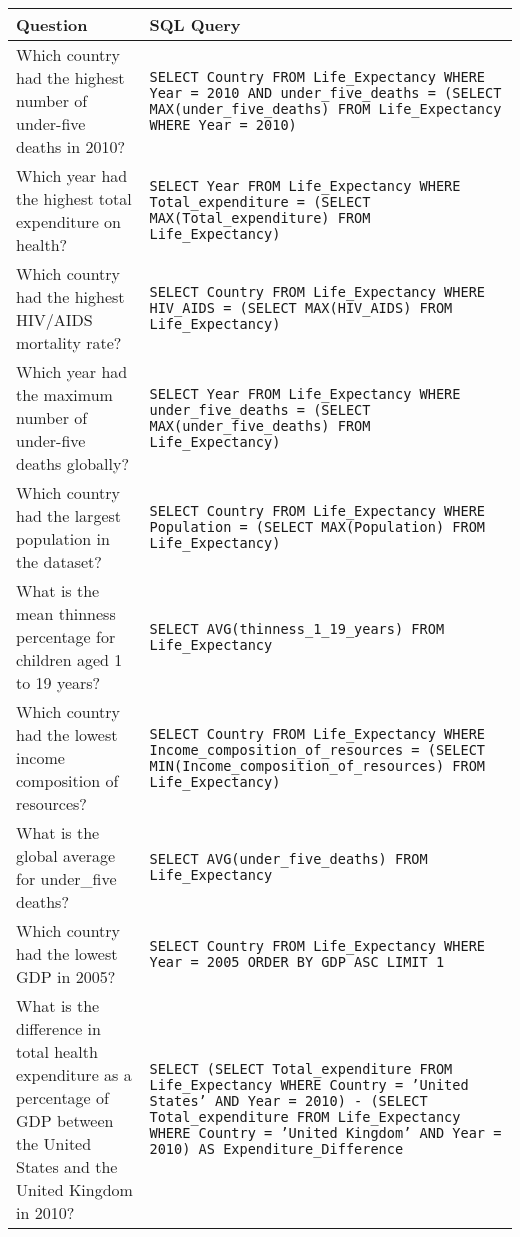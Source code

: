 \documentclass[11pt]{article}
\begin{document}
\begin{table*}[t]
\centering
\begin{tabular}{|p{}|p{}|}
\hline
\textbf{Question} & \textbf{SQL Query} \\
\hline

Which country had the highest number of under-five deaths in 2010? & \texttt{SELECT Country FROM Life\_Expectancy WHERE Year = 2010 AND under\_five\_deaths = (SELECT MAX(under\_five\_deaths) FROM Life\_Expectancy WHERE Year = 2010)} \\ \hline
Which year had the highest total expenditure on health? & \texttt{SELECT Year FROM Life\_Expectancy WHERE Total\_expenditure = (SELECT MAX(Total\_expenditure) FROM Life\_Expectancy)} \\ \hline
Which country had the highest HIV/AIDS mortality rate? & \texttt{SELECT Country FROM Life\_Expectancy WHERE HIV\_AIDS = (SELECT MAX(HIV\_AIDS) FROM Life\_Expectancy)} \\ \hline
Which year had the maximum number of under-five deaths globally? & \texttt{SELECT Year FROM Life\_Expectancy WHERE under\_five\_deaths = (SELECT MAX(under\_five\_deaths) FROM Life\_Expectancy)} \\ \hline
Which country had the largest population in the dataset? & \texttt{SELECT Country FROM Life\_Expectancy WHERE Population = (SELECT MAX(Population) FROM Life\_Expectancy)} \\ \hline
What is the mean thinness percentage for children aged 1 to 19 years? & \texttt{SELECT AVG(thinness\_1\_19\_years) FROM Life\_Expectancy} \\ \hline
Which country had the lowest income composition of resources? & \texttt{SELECT Country FROM Life\_Expectancy WHERE Income\_composition\_of\_resources = (SELECT MIN(Income\_composition\_of\_resources) FROM Life\_Expectancy)} \\ \hline
What is the global average for under\_five deaths? & \texttt{SELECT AVG(under\_five\_deaths) FROM Life\_Expectancy} \\ \hline
Which country had the lowest GDP in 2005? & \texttt{SELECT Country FROM Life\_Expectancy WHERE Year = 2005 ORDER BY GDP ASC LIMIT 1} \\ \hline
What is the difference in total health expenditure as a percentage of GDP between the United States and the United Kingdom in 2010? & \texttt{SELECT (SELECT Total\_expenditure FROM Life\_Expectancy WHERE Country = 'United States' AND Year = 2010) - (SELECT Total\_expenditure FROM Life\_Expectancy WHERE Country = 'United Kingdom' AND Year = 2010) AS Expenditure\_Difference} \\ \hline

\end{tabular}
\end{table*}
\end{document}

